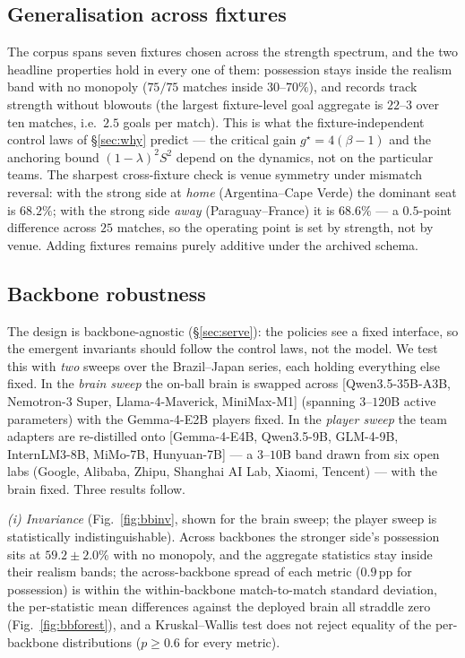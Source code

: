 \documentclass[11pt]{article}
\theoremstyle{definition}
\theoremstyle{remark}
\begin{document}
\subsection{Generalisation across fixtures}\label{sec:cross}

The corpus spans seven fixtures chosen across the strength spectrum, and the two headline properties hold in every one of them: possession stays inside the realism band with no monopoly ($75/75$ matches inside $30$--$70\%$), and records track strength without blowouts (the largest fixture-level goal aggregate is $22$--$3$ over ten matches, i.e.\ $2.5$ goals per match). This is what the fixture-independent control laws of \S\ref{sec:why} predict --- the critical gain $g^\star=4(\beta-1)$ and the anchoring bound $(1-\lambda)^2S^2$ depend on the dynamics, not on the particular teams. The sharpest cross-fixture check is venue symmetry under mismatch reversal: with the strong side at \emph{home} (Argentina--Cape Verde) the dominant seat is $68.2\%$; with the strong side \emph{away} (Paraguay--France) it is $68.6\%$ --- a $0.5$-point difference across $25$ matches, so the operating point is set by strength, not by venue. Adding fixtures remains purely additive under the archived schema.

\subsection{Backbone robustness}\label{sec:robust}

\smallskip\noindent The design is backbone-agnostic (\S\ref{sec:serve}): the policies see a fixed interface, so the emergent invariants should follow the control laws, not the model. We test this with \emph{two} sweeps over the Brazil--Japan series, each holding everything else fixed. In the \emph{brain sweep} the on-ball brain is swapped across [Qwen3.5-35B-A3B, Nemotron-3 Super, Llama-4-Maverick, MiniMax-M1] (spanning $3$--$120$B active parameters) with the Gemma-4-E2B players fixed. In the \emph{player sweep} the team adapters are re-distilled onto [Gemma-4-E4B, Qwen3.5-9B, GLM-4-9B, InternLM3-8B, MiMo-7B, Hunyuan-7B] --- a $3$--$10$B band drawn from six open labs (Google, Alibaba, Zhipu, Shanghai AI Lab, Xiaomi, Tencent) --- with the brain fixed. Three results follow.

\emph{(i) Invariance} (Fig.~\ref{fig:bbinv}, shown for the brain sweep; the player sweep is statistically indistinguishable). Across backbones the stronger side's possession sits at $59.2\pm2.0$\% with no monopoly, and the aggregate statistics stay inside their realism bands; the across-backbone spread of each metric ($0.9$\,pp for possession) is within the within-backbone match-to-match standard deviation, the per-statistic mean differences against the deployed brain all straddle zero (Fig.~\ref{fig:bbforest}), and a Kruskal--Wallis test does not reject equality of the per-backbone distributions ($p\ge0.6$ for every metric).
\end{document}
